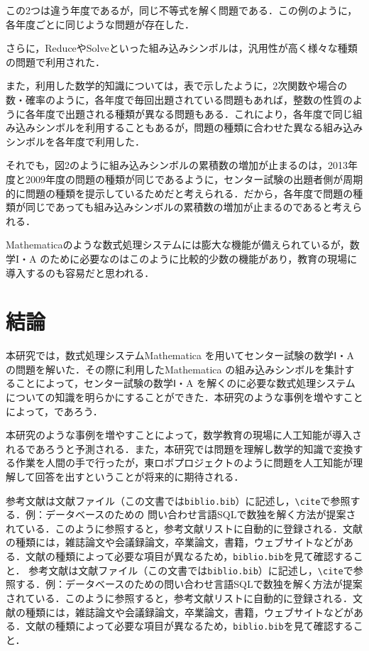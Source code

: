 この2つは違う年度であるが，同じ不等式を解く問題である．この例のように，各年度ごとに同じような問題が存在した．

\clearpage

さらに，ReduceやSolveといった組み込みシンボルは，汎用性が高く様々な種類の問題で利用された．

また，利用した数学的知識については，表で示したように，2次関数や場合の数・確率のように，各年度で毎回出題されている問題もあれば，整数の性質のように各年度で出題される種類が異なる問題もある．これにより，各年度で同じ組み込みシンボルを利用することもあるが，問題の種類に合わせた異なる組み込みシンボルを各年度で利用した．

それでも，図2のように組み込みシンボルの累積数の増加が止まるのは，2013年度と2009年度の問題の種類が同じであるように，センター試験の出題者側が周期的に問題の種類を提示しているためだと考えられる．だから，各年度で問題の種類が同じであっても組み込みシンボルの累積数の増加が止まるのであると考えられる．

Mathematicaのような数式処理システムには膨大な機能が備えられているが，数学I・A のために必要なのはこのように比較的少数の機能があり，教育の現場に導入するのも容易だと思われる．




\chapter{結論}

本研究では，数式処理システムMathematica を用いてセンター試験の数学Ⅰ・A の問題を解いた．その際に利用したMathematica の組み込みシンボルを集計することによって，センター試験の数学Ⅰ・A を解くのに必要な数式処理システムについての知識を明らかにすることができた．本研究のような事例を増やすことによって，であろう．

本研究のような事例を増やすことによって，数学教育の現場に人工知能が導入されるであろうと予測される．また，本研究では問題を理解し数学的知識で変換する作業を人間の手で行ったが，東ロボプロジェクトのように問題を人工知能が理解して回答を出すということが将来的に期待される．



参考文献は文献ファイル（この文書では\verb|biblio.bib|）に記述し，\verb|\cite|で参照する．例：データベースのための	問い合わせ言語SQLで数独を解く方法が提案されている\cite{yabuki2011}．このように参照すると，参考文献リストに自動的に登録される．文献の種類には，雑誌論文\cite{yabuki2011}や会議録論文\cite{yabuki2013}，卒業論文\cite{kubo2014}，書籍\cite{okumura2013}，ウェブサイト\cite{self}などがある．文献の種類によって必要な項目が異なるため，\verb|biblio.bib|を見て確認すること．
参考文献は文献ファイル（この文書では\verb|biblio.bib|）に記述し，\verb|\cite|で参照する．例：データベースのための問い合わせ言語SQLで数独を解く方法が提案されている\cite{yabuki2011}．このように参照すると，参考文献リストに自動的に登録される．文献の種類には，雑誌論文\cite{yabuki2011}や会議録論文\cite{yabuki2013}，卒業論文\cite{kubo2014}，書籍\cite{okumura2013}，ウェブサイト\cite{self}などがある．文献の種類によって必要な項目が異なるため，\verb|biblio.bib|を見て確認すること．




